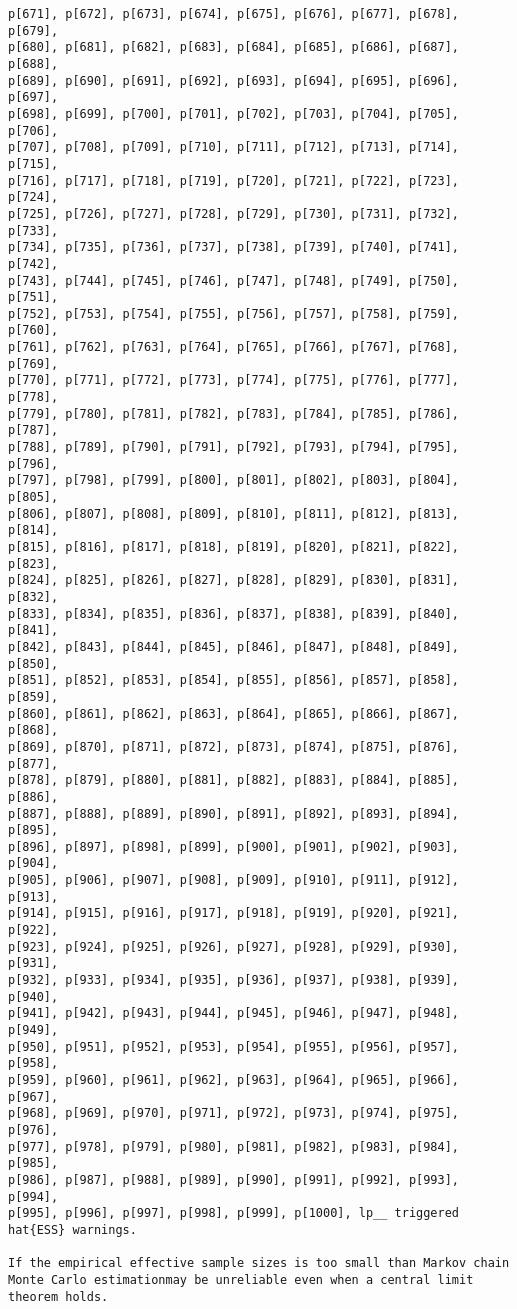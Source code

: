 \documentclass[
  letterpaper,
  DIV=11,
  numbers=noendperiod]{scrartcl}
\begin{document}
\begin{verbatim}
p[671], p[672], p[673], p[674], p[675], p[676], p[677], p[678], p[679],
p[680], p[681], p[682], p[683], p[684], p[685], p[686], p[687], p[688],
p[689], p[690], p[691], p[692], p[693], p[694], p[695], p[696], p[697],
p[698], p[699], p[700], p[701], p[702], p[703], p[704], p[705], p[706],
p[707], p[708], p[709], p[710], p[711], p[712], p[713], p[714], p[715],
p[716], p[717], p[718], p[719], p[720], p[721], p[722], p[723], p[724],
p[725], p[726], p[727], p[728], p[729], p[730], p[731], p[732], p[733],
p[734], p[735], p[736], p[737], p[738], p[739], p[740], p[741], p[742],
p[743], p[744], p[745], p[746], p[747], p[748], p[749], p[750], p[751],
p[752], p[753], p[754], p[755], p[756], p[757], p[758], p[759], p[760],
p[761], p[762], p[763], p[764], p[765], p[766], p[767], p[768], p[769],
p[770], p[771], p[772], p[773], p[774], p[775], p[776], p[777], p[778],
p[779], p[780], p[781], p[782], p[783], p[784], p[785], p[786], p[787],
p[788], p[789], p[790], p[791], p[792], p[793], p[794], p[795], p[796],
p[797], p[798], p[799], p[800], p[801], p[802], p[803], p[804], p[805],
p[806], p[807], p[808], p[809], p[810], p[811], p[812], p[813], p[814],
p[815], p[816], p[817], p[818], p[819], p[820], p[821], p[822], p[823],
p[824], p[825], p[826], p[827], p[828], p[829], p[830], p[831], p[832],
p[833], p[834], p[835], p[836], p[837], p[838], p[839], p[840], p[841],
p[842], p[843], p[844], p[845], p[846], p[847], p[848], p[849], p[850],
p[851], p[852], p[853], p[854], p[855], p[856], p[857], p[858], p[859],
p[860], p[861], p[862], p[863], p[864], p[865], p[866], p[867], p[868],
p[869], p[870], p[871], p[872], p[873], p[874], p[875], p[876], p[877],
p[878], p[879], p[880], p[881], p[882], p[883], p[884], p[885], p[886],
p[887], p[888], p[889], p[890], p[891], p[892], p[893], p[894], p[895],
p[896], p[897], p[898], p[899], p[900], p[901], p[902], p[903], p[904],
p[905], p[906], p[907], p[908], p[909], p[910], p[911], p[912], p[913],
p[914], p[915], p[916], p[917], p[918], p[919], p[920], p[921], p[922],
p[923], p[924], p[925], p[926], p[927], p[928], p[929], p[930], p[931],
p[932], p[933], p[934], p[935], p[936], p[937], p[938], p[939], p[940],
p[941], p[942], p[943], p[944], p[945], p[946], p[947], p[948], p[949],
p[950], p[951], p[952], p[953], p[954], p[955], p[956], p[957], p[958],
p[959], p[960], p[961], p[962], p[963], p[964], p[965], p[966], p[967],
p[968], p[969], p[970], p[971], p[972], p[973], p[974], p[975], p[976],
p[977], p[978], p[979], p[980], p[981], p[982], p[983], p[984], p[985],
p[986], p[987], p[988], p[989], p[990], p[991], p[992], p[993], p[994],
p[995], p[996], p[997], p[998], p[999], p[1000], lp__ triggered
hat{ESS} warnings.

If the empirical effective sample sizes is too small than Markov chain
Monte Carlo estimationmay be unreliable even when a central limit
theorem holds.
\end{verbatim}
\end{document}
